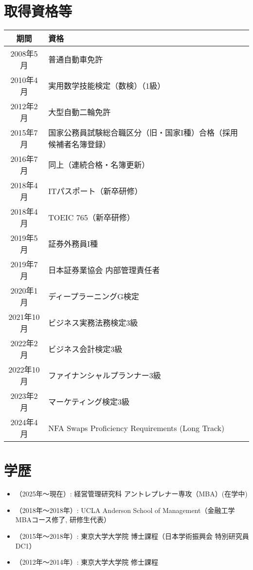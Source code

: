 \documentclass[uplatex,a4j,10.5pt,dvipdfmx]{jsarticle}
\begin{document}
\section{取得資格等}

\begin{longtable}{|c|l|}
	\hline
	\centering\textbf{期間} & \textbf{資格}                                     \\
	\hline
	\endhead

	\hline
	2008年5月               & 普通自動車免許                                         \\
	\hline
	2010年4月               & 実用数学技能検定（数検）（1級）                                \\
	\hline
	2012年2月               & 大型自動二輪免許                                        \\
	\hline
	2015年7月               & 国家公務員試験総合職区分（旧・国家I種）合格（採用候補者名簿登録）               \\
	\hline
	2016年7月               & 同上（連続合格・名簿更新）                                   \\
	\hline
	2018年4月               & ITパスポート（新卒研修）                                   \\
	\hline
	2018年4月               & TOEIC 765（新卒研修）                                 \\
	\hline
	2019年5月               & 証券外務員I種                                         \\
	\hline
	2019年7月               & 日本証券業協会 内部管理責任者                                 \\
	\hline
	2020年1月               & ディープラーニングG検定                                    \\
	\hline
	2021年10月              & ビジネス実務法務検定3級                                    \\
	\hline
	2022年2月               & ビジネス会計検定3級                                      \\
	\hline
	2022年10月              & ファイナンシャルプランナー3級                                 \\
	\hline
	2023年2月               & マーケティング検定3級                                     \\
	\hline
	2024年4月               & NFA Swaps Proficiency Requirements (Long Track) \\
	\hline
\end{longtable}

\section{学歴}
\begin{itemize}
	\item （2025年～現在）: 経営管理研究科 アントレプレナー専攻（MBA）(在学中)
	\item （2018年～2018年）: UCLA Anderson School of Management（金融工学 MBAコース修了, 研修生代表）
	\item （2015年～2018年）: 東京大学大学院 博士課程（日本学術振興会 特別研究員DC1）
	\item （2012年～2014年）: 東京大学大学院 修士課程
\end{itemize}
\end{document}
